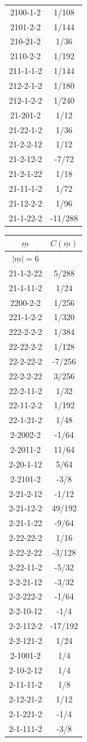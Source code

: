 \begin{tabular}[t]{|cc|}
2100-1-2 &  1/108\\
2101-2-2 &  1/144\\
210-21-2 &  1/36\\
2110-2-2 &  1/192\\
211-1-1-2 &  1/144\\
212-2-1-2 &  1/180\\
212-1-2-2 &  1/240\\
21-201-2 &  1/12\\
21-22-1-2 &  1/36\\
21-2-2-12 &  1/12\\
21-2-12-2 &  -7/72\\
21-2-1-22 &  1/18\\
21-11-1-2 &  1/72\\
21-12-2-2 &  1/96\\
21-1-22-2 &  -11/288\\
\hline
\end{tabular}
\begin{tabular}[t]{|cc|}
\hline
$\underline{m}$ & $C(\underline{m})$\\
\hline\hline
$|\underline{m}|=6$&\\
\hline
21-1-2-22 &  5/288\\
21-1-11-2 &  1/24\\
2200-2-2 &  1/256\\
221-1-2-2 &  1/320\\
222-2-2-2 &  1/384\\
22-22-2-2 &  1/128\\
22-2-22-2 &  -7/256\\
22-2-2-22 &  3/256\\
22-2-11-2 &  1/32\\
22-11-2-2 &  1/192\\
22-1-21-2 &  1/48\\
2-2002-2 &  -1/64\\
2-2011-2 &  11/64\\
2-20-1-12 &  5/64\\
2-2101-2 &  -3/8\\
2-21-2-12 &  -1/12\\
2-21-12-2 &  49/192\\
2-21-1-22 &  -9/64\\
2-22-22-2 &  1/16\\
2-22-2-22 &  -3/128\\
2-22-11-2 &  -5/32\\
2-2-21-12 &  -3/32\\
2-2-222-2 &  -1/64\\
2-2-10-12 &  -1/4\\
2-2-112-2 &  -17/192\\
2-2-121-2 &  1/24\\
2-1001-2 &  1/4\\
2-10-2-12 &  1/4\\
2-11-11-2 &  1/8\\
2-12-21-2 &  1/12\\
2-1-221-2 &  -1/4\\
2-1-111-2 &  -3/8\\
\hline
\end{tabular}


